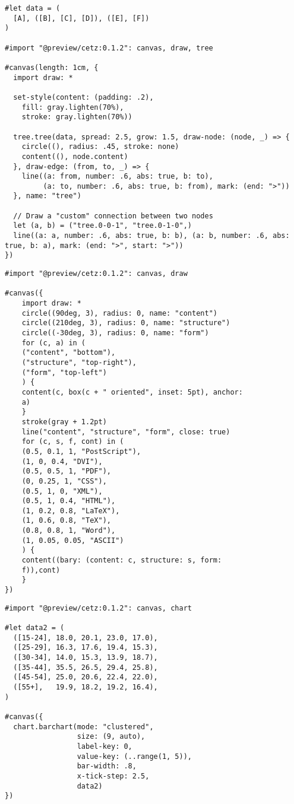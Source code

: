 \begin{verbatim}
#let data = (
  [A], ([B], [C], [D]), ([E], [F])
)

#import "@preview/cetz:0.1.2": canvas, draw, tree

#canvas(length: 1cm, {
  import draw: *

  set-style(content: (padding: .2),
    fill: gray.lighten(70%),
    stroke: gray.lighten(70%))

  tree.tree(data, spread: 2.5, grow: 1.5, draw-node: (node, _) => {
    circle((), radius: .45, stroke: none)
    content((), node.content)
  }, draw-edge: (from, to, _) => {
    line((a: from, number: .6, abs: true, b: to),
         (a: to, number: .6, abs: true, b: from), mark: (end: ">"))
  }, name: "tree")

  // Draw a "custom" connection between two nodes
  let (a, b) = ("tree.0-0-1", "tree.0-1-0",)
  line((a: a, number: .6, abs: true, b: b), (a: b, number: .6, abs: true, b: a), mark: (end: ">", start: ">"))
})
\end{verbatim}

\pandocbounded{}

\begin{verbatim}
#import "@preview/cetz:0.1.2": canvas, draw

#canvas({
    import draw: *
    circle((90deg, 3), radius: 0, name: "content")
    circle((210deg, 3), radius: 0, name: "structure")
    circle((-30deg, 3), radius: 0, name: "form")
    for (c, a) in (
    ("content", "bottom"),
    ("structure", "top-right"),
    ("form", "top-left")
    ) {
    content(c, box(c + " oriented", inset: 5pt), anchor:
    a)
    }
    stroke(gray + 1.2pt)
    line("content", "structure", "form", close: true)
    for (c, s, f, cont) in (
    (0.5, 0.1, 1, "PostScript"),
    (1, 0, 0.4, "DVI"),
    (0.5, 0.5, 1, "PDF"),
    (0, 0.25, 1, "CSS"),
    (0.5, 1, 0, "XML"),
    (0.5, 1, 0.4, "HTML"),
    (1, 0.2, 0.8, "LaTeX"),
    (1, 0.6, 0.8, "TeX"),
    (0.8, 0.8, 1, "Word"),
    (1, 0.05, 0.05, "ASCII")
    ) {
    content((bary: (content: c, structure: s, form:
    f)),cont)
    }
})
\end{verbatim}

\pandocbounded{}

\begin{verbatim}
#import "@preview/cetz:0.1.2": canvas, chart

#let data2 = (
  ([15-24], 18.0, 20.1, 23.0, 17.0),
  ([25-29], 16.3, 17.6, 19.4, 15.3),
  ([30-34], 14.0, 15.3, 13.9, 18.7),
  ([35-44], 35.5, 26.5, 29.4, 25.8),
  ([45-54], 25.0, 20.6, 22.4, 22.0),
  ([55+],   19.9, 18.2, 19.2, 16.4),
)

#canvas({
  chart.barchart(mode: "clustered",
                 size: (9, auto),
                 label-key: 0,
                 value-key: (..range(1, 5)),
                 bar-width: .8,
                 x-tick-step: 2.5,
                 data2)
})
\end{verbatim}

